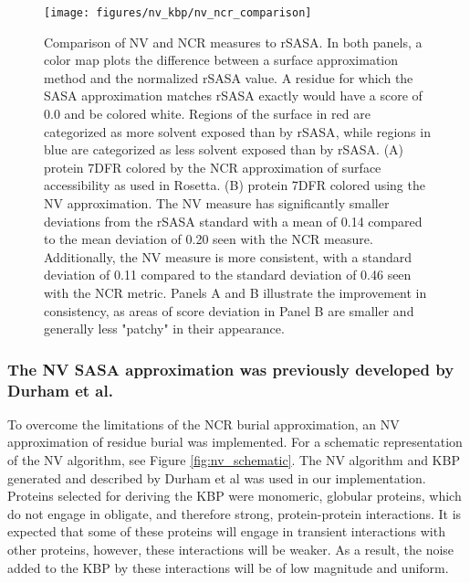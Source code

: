 \begin{figure}
\centering
\texttt{[image: figures/nv\_kbp/nv\_ncr\_comparison]}
\caption{
Comparison of \acs{NV} and \acs{NCR} measures to \acs{rSASA}.
In both panels, a color map plots the difference between a surface approximation method and the normalized \acs{rSASA} value.
A residue for which the \acs{SASA} approximation matches \acs{rSASA} exactly would have a score of 0.0 and be colored white.
Regions of the surface in red are categorized as more solvent exposed than by \acs{rSASA}, while regions in blue are categorized as less solvent exposed than by \acs{rSASA}.
(A) protein 7DFR colored by the \acs{NCR} approximation of surface accessibility as used in Rosetta.
(B) protein 7DFR colored using the \acs{NV} approximation.
The \acs{NV} measure has significantly smaller deviations from the \acs{rSASA} standard with a mean of 0.14 compared to the mean deviation of 0.20 seen with the \acs{NCR} measure.
Additionally, the \acs{NV} measure is more consistent, with a standard deviation of 0.11 compared to the standard deviation of 0.46 seen with the \acs{NCR} metric.
Panels A and B illustrate the improvement in consistency, as areas of score deviation in Panel B are smaller and generally less "patchy" in their appearance.
}
\label{fig:nv_ncr_comparison}
\end{figure}

\subsubsection{The \acs{NV} \acs{SASA} approximation was previously developed by Durham et al.}
To overcome the limitations of the \ac{NCR} burial approximation, an \ac{NV} approximation of residue burial was implemented.
For a schematic representation of the \ac{NV} algorithm, see Figure \ref{fig:nv_schematic}.
The \ac{NV} algorithm and \ac{KBP} generated and described by Durham et al \citep{Durham:2009kt}
was used in our implementation.
Proteins selected for deriving the \ac{KBP} were monomeric, globular proteins, which do not engage in obligate, and therefore strong, protein-protein interactions.
It is expected that some of these proteins will engage in transient interactions with other proteins, however, these interactions will be weaker.
As a result, the noise added to the \ac{KBP} by these interactions will be of low magnitude and uniform.

